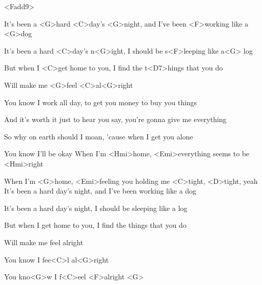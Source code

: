 

<Fadd9>

\zs

It's been a <G>hard <C>day's <G>night, and I've been <F>working like a <G>dog

It's been a hard <C>day's n<G>ight, I should be s<F>leeping like a<G> log

But when I <C>get home to you, I find the t<D7>hings that you do

Will make me <G>feel <C>al<G>right
\ks
\zs

You know I work all day, to get you money to buy you things

And it's worth it just to hear you say, you're gonna give me everything

So why on earth should I moan, 'cause when I get you alone

You know I'll be okay
\ks
\zr
When I'm <Hmi>home, <Emi>everything seems to be <Hmi>right

When I'm <G>home, <Emi>feeling you holding me <C>tight, <D>tight, yeah
\kr
\zs
It's been a hard day's night, and I've been working like a dog

It's been a hard day's night, I should be sleeping like a log

But when I get home to you, I find the things that you do

Will make me feel alright

You know I fee<C>l al<G>right

You kno<G>w I f<C>eel <F>alright <G> 
\ks
\kp


